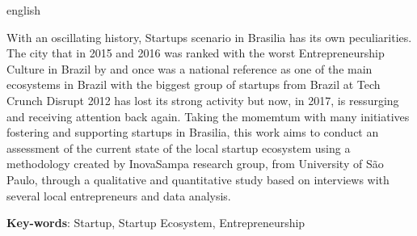 \begin{resumo}[Abstract]
 \begin{otherlanguage*}{english}

With an oscillating history, Startups scenario in Brasilia has its own peculiarities. The city that in 2015 and 2016 was ranked with the worst Entrepreneurship Culture in Brazil by  and once was a national reference as one of the main ecosystems in Brazil with the biggest group of startups from Brazil at Tech Crunch Disrupt 2012 has lost its strong activity but now, in 2017, is ressurging and receiving attention back again. Taking the momemtum with many initiatives fostering and supporting startups in Brasilia, this work aims to conduct an assessment of the current state of the local startup ecosystem using a methodology created by InovaSampa research group, from University of São Paulo, through a qualitative and quantitative study based on interviews with several local entrepreneurs and data analysis.

   \vspace{\onelineskip}

   \noindent
   \textbf{Key-words}: Startup, Startup Ecosystem, Entrepreneurship
 \end{otherlanguage*}
\end{resumo}
